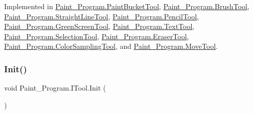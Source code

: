 Implemented in \mbox{\hyperlink{class_paint___program_1_1_paint_bucket_tool_af890852ac2b519cc0d2a7a767e09fe2d}{Paint\+\_\+\+Program.\+Paint\+Bucket\+Tool}}, \mbox{\hyperlink{class_paint___program_1_1_brush_tool_a29d903eb044890b73e06dd9aac2f5b5e}{Paint\+\_\+\+Program.\+Brush\+Tool}}, \mbox{\hyperlink{class_paint___program_1_1_straight_line_tool_a1052069a81f2ba116bb27b3346b4030f}{Paint\+\_\+\+Program.\+Straight\+Line\+Tool}}, \mbox{\hyperlink{class_paint___program_1_1_pencil_tool_a4805076bc9f2d54b48bb5e76a4e575d9}{Paint\+\_\+\+Program.\+Pencil\+Tool}}, \mbox{\hyperlink{class_paint___program_1_1_green_screen_tool_af580394652e180ac8f0acfb79704ffa4}{Paint\+\_\+\+Program.\+Green\+Screen\+Tool}}, \mbox{\hyperlink{class_paint___program_1_1_text_tool_a39c92c312fa71a01a3ce97c2c0293c25}{Paint\+\_\+\+Program.\+Text\+Tool}}, \mbox{\hyperlink{class_paint___program_1_1_selection_tool_a27eaa7276db68cea198c96a30b3dba9e}{Paint\+\_\+\+Program.\+Selection\+Tool}}, \mbox{\hyperlink{class_paint___program_1_1_eraser_tool_ae2c24c146b6269c7eae8b5c196298f5c}{Paint\+\_\+\+Program.\+Eraser\+Tool}}, \mbox{\hyperlink{class_paint___program_1_1_color_sampling_tool_a6d26407d4a5040f66c417c7ccaf75793}{Paint\+\_\+\+Program.\+Color\+Sampling\+Tool}}, and \mbox{\hyperlink{class_paint___program_1_1_move_tool_a909f48c0aa28f1f5932b42dfa076200b}{Paint\+\_\+\+Program.\+Move\+Tool}}.

\mbox{\label{interface_paint___program_1_1_i_tool_af823123a30fbda34e24e907243241046}} 
\subsubsection{\texorpdfstring{Init()}{Init()}}
{\footnotesize\ttfamily void Paint\+\_\+\+Program.\+I\+Tool.\+Init (\begin{DoxyParamCaption}{ }\end{DoxyParamCaption})}



